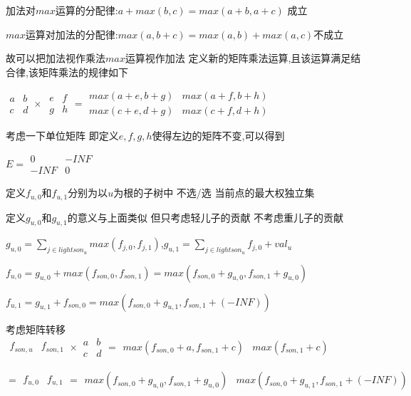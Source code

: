 \documentclass[a4paper]{ctexart}
\begin{document}
加法对$max$运算的分配律:$a+max(b,c)=max(a+b,a+c)$ 成立

$max$运算对加法的分配律:$max(a,b+c)=max(a,b)+max(a,c)$不成立

故可以把加法视作乘法$max$运算视作加法 定义新的矩阵乘法运算,且该运算满足结合律,该矩阵乘法的规律如下

$\begin{matrix}a&b\\c&d\end{matrix}\times\ \begin{matrix}e&f\\g&h\end{matrix}=\begin{matrix}max(a+e,b+g)&max(a+f,b+h)\\max(c+e,d+g)&max(c+f,d+h)\end{matrix}$

考虑一下单位矩阵 即定义$e,f,g,h$使得左边的矩阵不变,可以得到

$E=\begin{matrix}0&-INF\\-INF&0\end{matrix}$

定义$f_{u,0}$和$f_{u,1}$分别为以$u$为根的子树中 不选/选 当前点的最大权独立集

定义$g_{u,0}$和$g_{u,1}$的意义与上面类似 但只考虑轻儿子的贡献 不考虑重儿子的贡献

$g_{u,0}=\sum\limits_{j\in lightson_u}max(f_{j,0},f_{j,1})$,$g_{u,1}={\sum\limits_{j\in lightson_u}f_{j,0}}+val_u$

$f_{u,0}=g_{u,0}+max(f_{son,0},f_{son,1})=max(f_{son,0}+g_{u,0},f_{son,1}+g_{u,0})$

$f_{u,1}=g_{u,1}+f_{son,0}=max(f_{son,0}+g_{u,1},f_{son,1}+(-INF))$

考虑矩阵转移
$\begin{matrix}f_{son,u}&f_{son,1}\end{matrix}\times \begin{matrix}a&b\\c&d\end{matrix}=\begin{matrix}max(f_{son,0}+a,f_{son,1}+c)&max(f_{son,1}+c)\end{matrix}$

$=\begin{matrix}f_{u,0}&f_{u,1}\end{matrix}=\begin{matrix}max(f_{son,0}+g_{u,0},f_{son,1}+g_{u,0})&max(f_{son,0}+g_{u,1},f_{son,1}+(-INF))\end{matrix}$
\end{document}
